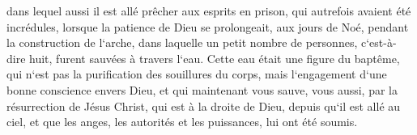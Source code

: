 \verse dans lequel aussi il est allé prêcher aux esprits en prison, 
\verse qui autrefois avaient été incrédules, lorsque la patience de Dieu se prolongeait, aux jours de Noé, pendant la construction de l`arche, dans laquelle un petit nombre de personnes, c`est-à-dire huit, furent sauvées à travers l`eau. 
\verse Cette eau était une figure du baptême, qui n`est pas la purification des souillures du corps, mais l`engagement d`une bonne conscience envers Dieu, et qui maintenant vous sauve, vous aussi, par la résurrection de Jésus Christ, 
\verse qui est à la droite de Dieu, depuis qu`il est allé au ciel, et que les anges, les autorités et les puissances, lui ont été soumis. 

\chapter{}

